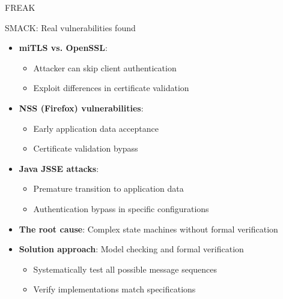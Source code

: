 \documentclass[aspectratio=169, lualatex, handout]{beamer}
\begin{document}
\begin{frame}{FREAK}
\end{frame}

\begin{frame}{SMACK: Real vulnerabilities found}
	\begin{itemize}[<+->]
		\item \textbf{miTLS vs. OpenSSL}:
		      \begin{itemize}
			      \item Attacker can skip client authentication
			      \item Exploit differences in certificate validation
		      \end{itemize}
		\item \textbf{NSS (Firefox) vulnerabilities}:
		      \begin{itemize}
			      \item Early application data acceptance
			      \item Certificate validation bypass
		      \end{itemize}
		\item \textbf{Java JSSE attacks}:
		      \begin{itemize}
			      \item Premature transition to application data
			      \item Authentication bypass in specific configurations
		      \end{itemize}
		\item \textbf{The root cause}: Complex state machines without formal verification
		\item \textbf{Solution approach}: Model checking and formal verification
		      \begin{itemize}
			      \item Systematically test all possible message sequences
			      \item Verify implementations match specifications
		      \end{itemize}
	\end{itemize}
\end{frame}
\end{document}
